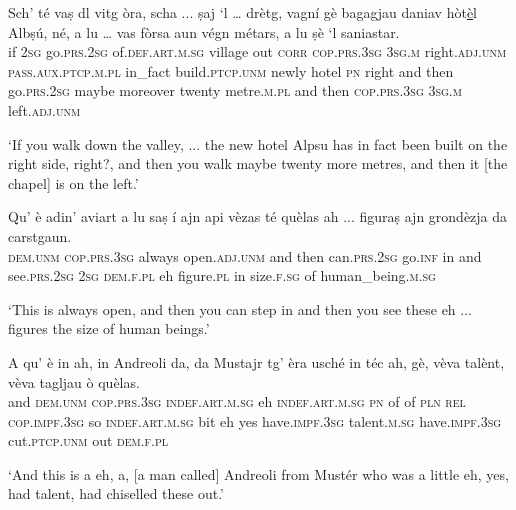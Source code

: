 \begin{linenumbers}
\gll  Sch’ té vaṣ dl vitg òra, scha ... ṣaj `l … drètg, vagní\footnotemark{} gè bagagjau daniav hòt\underline {è}l Albṣú, né, a lu … vas fòrsa aun végn métars, a lu ṣè `l\footnotemark{} saniastar.\\
if \textsc{2sg} go.\textsc{prs.2sg} of.\textsc{def.art.m.sg} village out \textsc{corr} {} \textsc{cop.prs.3sg} \textsc{3sg.m} {} right.\textsc{adj.unm} \textsc{pass.aux.ptcp.m.pl} in\_fact build.\textsc{ptcp.unm} newly hotel \textsc{pn} right and then {} go.\textsc{prs.2sg} maybe moreover twenty metre.\textsc{m.pl} and then \textsc{cop.prs.3sg} \textsc{3sg.m} left.\textsc{adj.unm}\\
\end{linenumbers}
\medskip
\glt `If you walk down the valley, ... the new hotel Alpsu has in fact been built on the right side, right?, and then you walk maybe twenty more metres, and then it [the chapel] is on the left.'

\medskip

\begin{linenumbers}
\gll  Qu’ è adin' aviart a lu saṣ í ajn api vèzas té quèlas ah ... figuraṣ ajn grondèzja da carstgaun.\\
 \textsc{dem.unm} \textsc{cop.prs.3sg} always open.\textsc{adj.unm} and then can.\textsc{prs.2sg} go.\textsc{inf} in and see.\textsc{prs.2sg} \textsc{2sg} \textsc{dem.f.pl} eh {} figure.\textsc{pl} in size.\textsc{f.sg} of human\_being.\textsc{m.sg} \\
\end{linenumbers}
\medskip
\glt `This is always open, and then you can step in and then you see these eh ... figures the size of human beings.'
\medskip

\begin{linenumbers}
\gll   A qu’ è in ah, in  Andreoli da, da Mustajr tg’ èra usché in téc ah, gè, vèva talènt, vèva tagljau ò quèlas. \\
and \textsc{dem.unm} \textsc{cop.prs.3sg} \textsc{indef.art.m.sg} eh \textsc{indef.art.m.sg} \textsc{pn} of of \textsc{pln} \textsc{rel} \textsc{cop.impf.3sg} so \textsc{indef.art.m.sg} bit eh yes have.\textsc{impf.3sg} talent.\textsc{m.sg} have.\textsc{impf.3sg} cut.\textsc{ptcp.unm} out \textsc{dem.f.pl}\\
\end{linenumbers}
\medskip
\glt `And this is a eh, a, [a man called] Andreoli from Mustér who was a little eh, yes, had talent, had chiselled these out.'
\medskip

